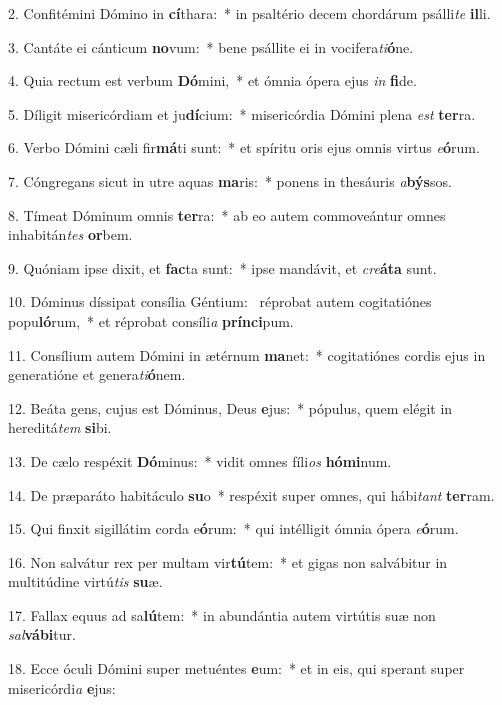 2. Confitémini Dómino in \textbf{cí}thara:~*  in psaltério decem chordárum psálli\textit{te} \textbf{il}li.\

3. Cantáte ei cánticum \textbf{no}vum:~*  bene psállite ei in vocifera\textit{ti}\textbf{ó}ne.\

4. Quia rectum est verbum \textbf{Dó}mini,~*  et ómnia ópera ejus \textit{in} \textbf{fi}de.\

5. Díligit misericórdiam et ju\textbf{dí}cium:~*  misericórdia Dómini plena \textit{est} \textbf{ter}ra.\

6. Verbo Dómini cæli fir\textbf{má}ti sunt:~*  et spíritu oris ejus omnis virtus \textit{e}\textbf{ó}rum.\

7. Cóngregans sicut in utre aquas \textbf{ma}ris:~*  ponens in thesáuris \textit{a}\textbf{býs}sos.\

8. Tímeat Dóminum omnis \textbf{ter}ra:~*  ab eo autem commoveántur omnes inhabitán\textit{tes} \textbf{or}bem.\

9. Quóniam ipse dixit, et \textbf{fac}ta sunt:~*  ipse mandávit, et \textit{cre}\textbf{á}\textbf{ta} sunt.\

10. Dóminus díssipat consília Géntium: \dag\  réprobat autem cogitatiónes popu\textbf{ló}rum,~*  et réprobat consíli\textit{a} \textbf{prín}\textbf{ci}pum.\

11. Consílium autem Dómini in ætérnum \textbf{ma}net:~*  cogitatiónes cordis ejus in generatióne et genera\textit{ti}\textbf{ó}nem.\

12. Beáta gens, cujus est Dóminus, Deus \textbf{e}jus:~*  pópulus, quem elégit in hereditá\textit{tem} \textbf{si}bi.\

13. De cælo respéxit \textbf{Dó}minus:~*  vidit omnes fíli\textit{os} \textbf{hó}\textbf{mi}num.\

14. De præparáto habitáculo \textbf{su}o~*  respéxit super omnes, qui hábi\textit{tant} \textbf{ter}ram.\

15. Qui finxit sigillátim corda e\textbf{ó}rum:~*  qui intélligit ómnia ópera \textit{e}\textbf{ó}rum.\

16. Non salvátur rex per multam vir\textbf{tú}tem:~*  et gigas non salvábitur in multitúdine virtú\textit{tis} \textbf{su}æ.\

17. Fallax equus ad sa\textbf{lú}tem:~*  in abundántia autem virtútis suæ non \textit{sal}\textbf{vá}\textbf{bi}tur.\

18. Ecce óculi Dómini super metuéntes \textbf{e}um:~*  et in eis, qui sperant super misericórdi\textit{a} \textbf{e}jus:\

